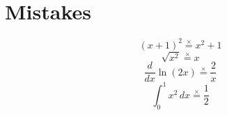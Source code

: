 \documentclass[11pt,a4paper]{article}
\providecommand{\xmark}{\ensuremath{\times}}
\theoremstyle{plain}
\theoremstyle{definition}
\theoremstyle{remark}
\begin{document}
\section*{Mistakes}

\begin{equation*}
  (x + 1)^2 \overset{\xmark }{=} x^2 + 1
\end{equation*}
\begin{equation*}
  \sqrt{x^2} \overset{\xmark }{=} x
\end{equation*}
\begin{equation*}
  \frac{d}{dx} \ln(2x) \overset{\xmark }{=} \frac{2}{x}
\end{equation*}
\begin{equation*}
  \int_0^1 x^2 \, dx \overset{\xmark }{=} \frac{1}{2}
\end{equation*}
\end{document}
